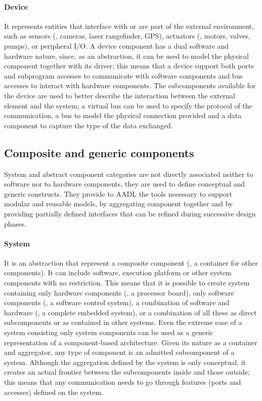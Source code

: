 \paragraph{Device} It represents entities that interface with or are part of the external environment, such as sensors (\eg, cameras, laser rangefinder, GPS), actuators (\eg, motors, valves, pumps), or peripheral I/O. A device component has a dual software and hardware nature, since, as an abstraction, it can be used to model the physical component together with its driver; this means that a device support both ports and subprogram accesses to communicate with software components and bus accesses to interact with hardware components. The subcomponents available for the device are used to better describe the interaction between the external element and the system; a virtual bus can be used to specify the protocol of the communication, a bus to model the physical connection provided and a data component to capture the type of the data exchanged.

\subsection{Composite and generic components}
System and abstract component categories are not directly associated neither to software nor to hardware components, they are used to define conceptual and generic constructs. They provide to AADL the tools necessary to support modular and reusable models, by aggregating component together and by providing partially defined interfaces that can be refined during successive design phases.

\paragraph{System} It is an abstraction that represent a composite component (\ie, a container for other components). It can include software, execution platform or other system components with no restriction. This means that it is possible to create system containing only hardware components (\eg, a processor board), only software components (\eg, a software control system), a combination of software and hardware (\eg, a complete embedded system),  or a combination of all these as direct subcomponents or as contained in other systems. Even the extreme case of a system consisting only system components can be used as a generic representation of a component-based architecture. Given its nature as a container and aggregator, any type of component is an admitted subcomponent of a system. Although the aggregation defined by the system is only conceptual, it creates an actual frontier between the subcomponents inside and those outside; this means that any communication needs to go through features (\ie ports and accesses) defined on the system.

